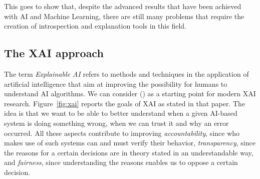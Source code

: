\documentclass[conference]{IEEEtran}
\begin{document}
This goes to show that, despite the advanced results that have been achieved
with AI and Machine Learning, there are still many problems that require the
creation of introspection and explanation tools in this field.







\subsection{The XAI approach}
\label{sec:xai}

The term \textit{Explainable AI} refers to methods and techniques in the
application of artificial intelligence that aim at improving the possibility for
humans to understand AI algorithms. We can consider (\cite{DARPA}) as a starting
point for modern XAI research. Figure~\ref{fig:xai} reports the goals of XAI as
stated in that paper. The idea is that we want to be able to better understand
when a given AI-based system is doing something wrong, when we can trust it and
why an error occurred. All these aspects contribute to improving
\textit{accountability}, since who makes use of such systems can and must verify
their behavior, \textit{transparency}, since the reasons for a certain decisions
are in theory stated in an understandable way, and \textit{fairness}, since
understanding the reasons enables us to oppose a certain decision.
\end{document}
